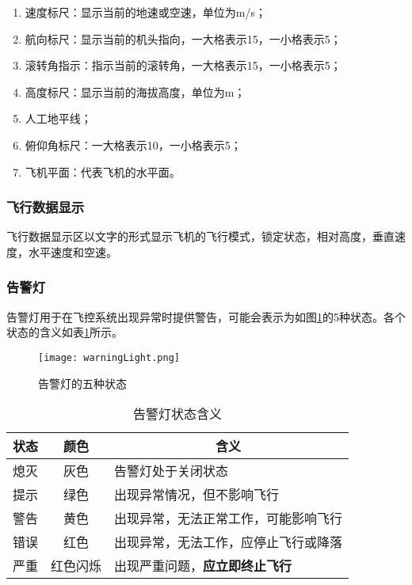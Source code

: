 \begin{enumerate}[label=\arabic*.,topsep=0pt]
\setlength{\itemsep}{-2pt}
\item 速度标尺：显示当前的地速或空速，单位为m/s；
\item 航向标尺：显示当前的机头指向，一大格表示15\degree，一小格表示5\degree；
\item 滚转角指示：指示当前的滚转角，一大格表示15\degree，一小格表示5\degree；
\item 高度标尺：显示当前的海拔高度，单位为m；
\item 人工地平线；
\item 俯仰角标尺：一大格表示10\degree，一小格表示5\degree；
\item 飞机平面：代表飞机的水平面。
\end{enumerate}

\subsubsection{飞行数据显示}
飞行数据显示区以文字的形式显示飞机的飞行模式，锁定状态，相对高度，垂直速度，水平速度和空速。

\subsubsection{告警灯}
告警灯用于在飞控系统出现异常时提供警告，可能会表示为如图\ref{fwarn}的5种状态。各个状态的含义如表\ref{twarn}所示。
\begin{figure}[ht]
	\begin{center}
		\texttt{[image: warningLight.png]}
		\caption{告警灯的五种状态}
		\label{fwarn}
	\end{center}
\end{figure}

\begin{table}[ht]
\centering
\caption{告警灯状态含义}
\label{twarn}
\begin{tabular}{ccl}
\toprule
\multicolumn{1}{c}{状态} & \multicolumn{1}{c}{颜色}   & \multicolumn{1}{c}{含义} \\ \midrule
熄灭 & 灰色 & 告警灯处于关闭状态 \\
提示 & 绿色 & 出现异常情况，但不影响飞行     \\
警告 & 黄色 & 出现异常，无法正常工作，可能影响飞行    \\
错误 & 红色 & 出现异常，无法工作，应停止飞行或降落    \\
严重 & 红色闪烁  & 出现严重问题，{\color{red}\textbf{应立即终止飞行}}   \\ \bottomrule
\end{tabular}
\end{table}


